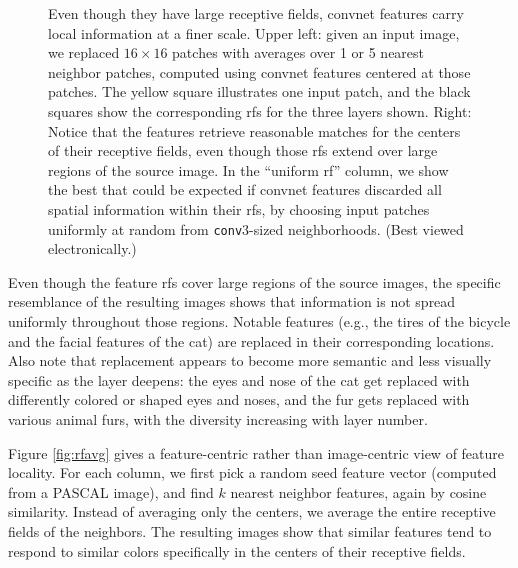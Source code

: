 \documentclass{article} %
\begin{document}
\begin{figure}[t]
\caption{
Even though they have large receptive fields, convnet features carry
local information at a finer scale.
Upper left: given an input image, we replaced $16 \times 16$ patches with
averages over 1 or 5 nearest neighbor patches, computed using convnet features
centered at those patches.
The yellow square illustrates one input patch, and the black squares show the
corresponding rfs for the three layers shown.
Right: Notice that the features retrieve reasonable matches for the centers of
their receptive fields, even though those rfs extend over large regions of the
source image.
In the ``uniform rf'' column, we show the best that could be expected if convnet
features discarded all spatial information within their rfs, by choosing input
patches uniformly at random from \texttt{conv}3-sized neighborhoods.
(Best viewed electronically.)
}
\label{fig:patches}
\end{figure}

Even though the feature rfs cover large regions of the source images, the
specific resemblance of the resulting images shows that information is not
spread uniformly throughout those regions.
Notable features (e.g., the tires of the bicycle and the facial features of the
cat) are replaced in their corresponding locations.
Also note that replacement appears to become more semantic and less visually
specific as the layer deepens: the eyes and nose of the cat get replaced with
differently colored or shaped eyes and noses, and the fur gets replaced with
various animal furs, with the diversity increasing with layer number.

Figure \ref{fig:rfavg} gives a feature-centric rather than image-centric view of
feature locality.
For each column, we first pick a random seed feature vector (computed from
a PASCAL image), and find $k$ nearest neighbor features, again by cosine
similarity.
Instead of averaging only the centers, we average the entire receptive fields of
the neighbors.
The resulting images show that similar features tend to respond to similar
colors specifically in the centers of their receptive fields.
\end{document}
